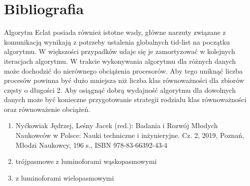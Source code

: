 \documentclass{article}
\begin{document}
	\section{Bibliografia}

Algorytm Eclat posiada również istotne wady, główne narzuty związane z komunikacją wynikają z potrzeby ustalenia globalnych tid-list na początku algorytmu. W większości przypadków udaje się je zamortyzować w kolejnych iteracjach algorytmu. W trakcie wykonywania algorytmu dla różnych danych może dochodzić do nierównego obciążenia procesorów. Aby tego uniknąć liczba procesów powinna być dużo mniejsza niż liczba klas równoważności dla zbiorów częsty o długości 2. Aby osiągnąć dobrą wydajność algorytmu dla dowolnych danych może być konieczne przygotowanie strategii rodziału klas równoważności oraz równoważenie obciążeń.
					
		
		
		\begin{enumerate}
			\item Nyćkowiak Jędrzej, Leśny Jacek (red.): Badania i Rozwój Młodych Naukowców w Polsce: Nauki techniczne i inżynieryjne. Cz. 2, 2019, Poznań, Młodzi Naukowcy, 196 s., ISBN 978-83-66392-43-4
			\item trójpasmowe z luminoforami wąskopasmowymi
			\item z luminoforami wielopasmowymi
		\end{enumerate} 	
	
	\clearpage %
	
\end{document}
